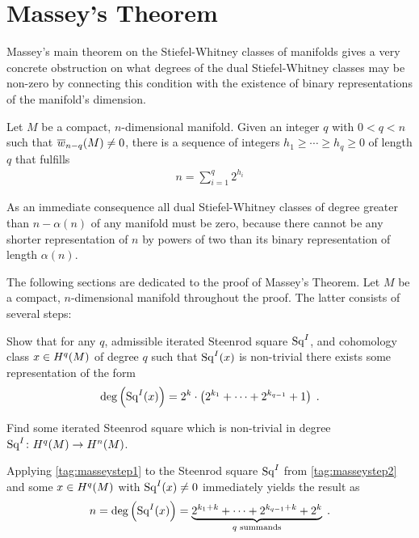% 

\chapter{Massey's Theorem}

Massey's main theorem on the Stiefel-Whitney classes of manifolds
gives a very concrete obstruction on what degrees of the dual
Stiefel-Whitney classes may be non-zero
by connecting this condition with the existence of binary
representations of the manifold's dimension.
\begin{Thm}[Massey]\label{thm:massey}
  Let $M$ be a compact, $n$-dimensional manifold.
  Given an integer $q$ with $0<q<n$ such that ${\overline{w}_{n-q}}(M)\neq0$,
  there is a sequence of integers $h_1\geq\dotsb\geq h_q\geq0$ of
  length $q$ that fulfills
  \begin{gather*}
    n = \sum_{i=1}^{q} 2^{h_i}
  \end{gather*}
\end{Thm}

As an immediate consequence all dual Stiefel-Whitney classes of degree
greater than $n-\alpha(n)$ of any manifold must be zero, because there
cannot be any shorter representation of $n$ by powers of two
than its binary representation of length $\alpha(n)$.

The following sections are dedicated to the proof of Massey's Theorem.
Let $M$ be a compact, $n$-dimensional manifold throughout the proof.
The latter consists of several steps:
\begin{steps}
\item\label{tag:masseystep1} 
  Show that for any $q$, admissible iterated Steenrod square $\mathrm{Sq}^{I}$, and cohomology
  class $x\in H^q(M)$ of degree $q$ such that $\mathrm{Sq}^{I}(x)$ is non-trivial there exists
  some representation of the form
  \begin{gather*}
    \deg \left(\mathrm{Sq}^{I}(x)\right)
    = 2^k\cdot
    \left( 2^{k_1}+\dotsb+2^{k_{q-1}} + 1 \right)
    \;.
  \end{gather*}
\item\label{tag:masseystep2}
  Find some iterated Steenrod square which is non-trivial in degree
  $\mathrm{Sq}^{I}\colon H^q(M)\to H^n(M)$.
\end{steps}
Applying \ref{tag:masseystep1} to the Steenrod square $\mathrm{Sq}^{I}$ from
\ref{tag:masseystep2} and some $x\in H^q(M)$ with $\mathrm{Sq}^{I}(x)\neq 0$
immediately yields the result as
\begin{gather*}
  n = \deg\left(\mathrm{Sq}^{I}(x)\right) = \underbrace
  {2^{k_1+k}+\dotsb+2^{k_{q-1}+k} + 2^{k}}_{\text{$q$ summands}}
  \;.
\end{gather*}

